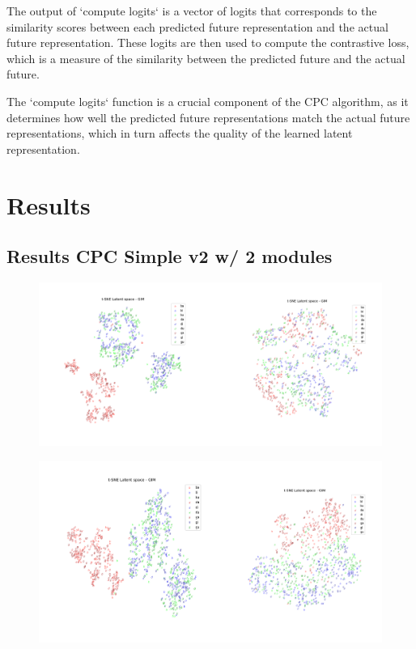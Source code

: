 The output of `compute logits` is a vector of logits that corresponds to the similarity scores between each predicted future representation and the actual future representation. These logits are then used to compute the contrastive loss, which is a measure of the similarity between the predicted future and the actual future.

The `compute logits` function is a crucial component of the CPC algorithm, as it determines how well the predicted future representations match the actual future representations, which in turn affects the quality of the learned latent representation.




\section{Results}
\subsection{Results CPC Simple v2 w/ 2 modules}

\begin{figure}[h]
	\centering
	\includegraphics[width=0.7\linewidth]{screenshot023}
	\caption{}
	\label{fig:tsne_two_module_kld_0}
\end{figure}


\begin{figure}[h]
	\centering
	\includegraphics[width=0.7\linewidth]{screenshot024}
	\caption{}
	\label{fig:tsne_two_module_kld_0033}
\end{figure}

